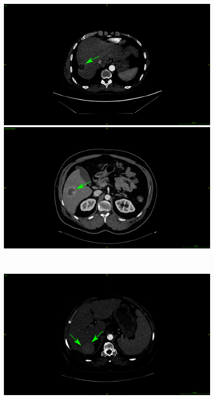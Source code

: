 \begin{figure}[!ht]
	\centering
	\begin{minipage}{0.45\linewidth}
		\includegraphics[width=\linewidth]{../Contributions/images/ImagingTraits/ResizeGDB_peritumoralEnhancement}
	\end{minipage} \hspace{-0.1cm}
	\begin{minipage}{0.45\linewidth}
		\includegraphics[width=\linewidth]{../Contributions/images/ImagingTraits/ResizeTCIA_peritumoralEnhancement}
	\end{minipage} \\
	\begin{minipage}{0.45\linewidth}
		\includegraphics[width=\linewidth]{../Contributions/images/ImagingTraits/ResizeGDB_smoothMargins}

\end{minipage}
\end{figure}
